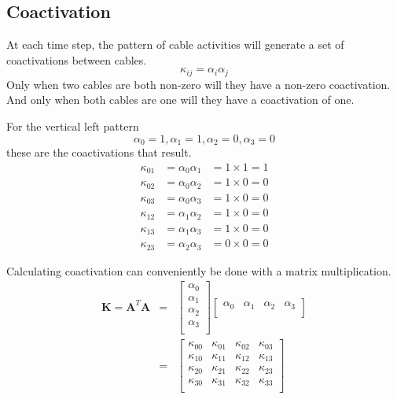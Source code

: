 \subsection{Coactivation}
\label{subsec:algocoactivation}

At each time step, the pattern of cable activities will generate a set
of coactivations between cables.
\begin{equation}
\kappa_{ij} = \alpha_i \alpha_j
\end{equation}
Only when two cables are both
non-zero will they have a non-zero coactivation. And only when both cables
are one will they have a coactivation of one.

For the vertical left pattern
\begin{equation}
\alpha_0 = 1, \alpha_1 = 1, \alpha_2 = 0, \alpha_3 = 0
\end{equation}
these are the coactivations that result.
\begin{eqnarray}
\kappa_{01}&= \alpha_0 \alpha_1&= 1 \times 1 = 1\\
\kappa_{02}&= \alpha_0 \alpha_2&= 1 \times 0 = 0\\
\kappa_{03}&= \alpha_0 \alpha_3&= 1 \times 0 = 0\\
\kappa_{12}&= \alpha_1 \alpha_2&= 1 \times 0 = 0\\
\kappa_{13}&= \alpha_1 \alpha_3&= 1 \times 0 = 0\\
\kappa_{23}&= \alpha_2 \alpha_3&= 0 \times 0 = 0
\end{eqnarray}

Calculating coactivation can conveniently be done with
a matrix multiplication.
\begin{eqnarray}
\mathbf{K} = \mathbf{A}^T\mathbf{A} &=&
\begin{bmatrix}
  \alpha_{0} \\
  \alpha_{1} \\
  \alpha_{2} \\
  \alpha_{3} \\
\end{bmatrix}
\begin{bmatrix}
  \alpha_{0} &
  \alpha_{1} &
  \alpha_{2} &
  \alpha_{3} \\
\end{bmatrix}\\
&=&
\begin{bmatrix}
  \kappa_{00} & \kappa_{01} & \kappa_{02} & \kappa_{03} \\
  \kappa_{10} & \kappa_{11} & \kappa_{12} & \kappa_{13} \\
  \kappa_{20} & \kappa_{21} & \kappa_{22} & \kappa_{23} \\
  \kappa_{30} & \kappa_{31} & \kappa_{32} & \kappa_{33} \\
\end{bmatrix}
\end{eqnarray}

